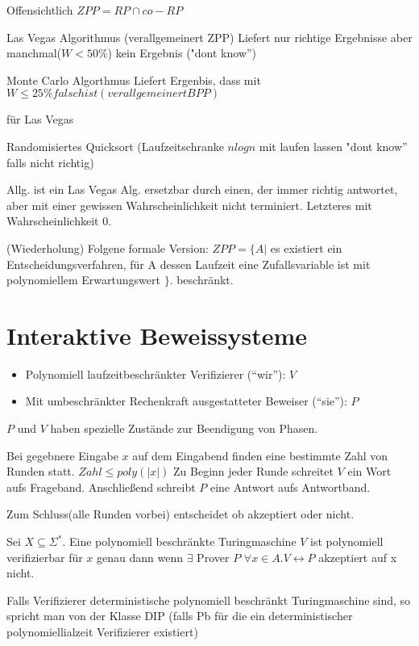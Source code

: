 Offensichtlich $ZPP = RP \cap co - RP$

Las Vegas Algorithmus (verallgemeinert ZPP) Liefert nur richtige Ergebnisse aber manchmal($W<50\%$) kein Ergebnis ("dont know'')

Monte Carlo Algorthmus Liefert Ergenbis, dass mit $W \leq 25\% falsch ist (verallgemeinert BPP)$

\begin{beispiel}
für Las Vegas

Randomisiertes Quicksort (Laufzeitschranke $n log n$ mit laufen lassen
"dont know'' falls nicht richtig)
\end{beispiel}

Allg. ist ein Las Vegas Alg. ersetzbar durch einen, der immer richtig
antwortet, aber mit einer gewissen Wahrscheinlichkeit nicht
terminiert. Letzteres mit Wahrscheinlichkeit $0$.

(Wiederholung)
Folgene formale Version:
$ZPP = \{A |$ es existiert ein Entscheidungsverfahren, für A dessen Laufzeit eine Zufallsvariable ist mit polynomiellem Erwartungswert $\}$. beschränkt.

\section{Interaktive Beweissysteme}
\begin{itemize}
\item Polynomiell laufzeitbeschränkter Verifizierer (``wir''): $V$
\item Mit umbeschränkter Rechenkraft ausgestatteter Beweiser (``sie''): $P$
\end{itemize}


$P$ und $V$ haben spezielle Zustände zur Beendigung von Phasen.

Bei gegebnere Eingabe $x$ auf dem Eingabend finden eine bestimmte Zahl von Runden statt.
$Zahl \leq poly (|x|)$
Zu Beginn jeder Runde schreitet $V$ ein Wort aufs Frageband. Anschließend schreibt $P$ eine Antwort aufs Antwortband.

Zum Schluss(alle Runden vorbei) entscheidet ob akzeptiert oder nicht.

\begin{definition}
Sei $X \subseteq \Sigma^*$. Eine polynomiell beschränkte Turingmaschine $V$ ist polynomiell verifizierbar für $x$
genau dann wenn $ \exists$ Prover $P$
$\forall x \in A . V \leftrightarrow P$ akzeptiert auf x nicht.

Falls Verifizierer deterministische polynomiell beschränkt
Turingmaschine sind, so spricht man von der Klasse DIP (falls Pb für
die ein deterministischer polynomiellialzeit Verifizierer existiert)
\end{definition}


